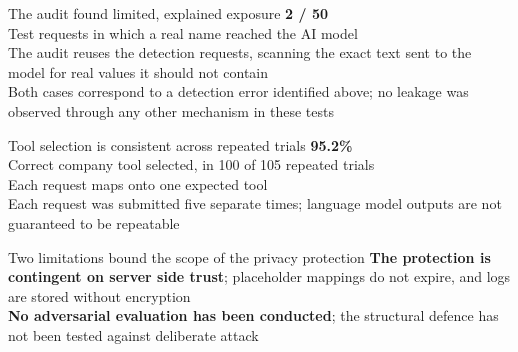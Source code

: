 \documentclass[aspectratio=169,11pt]{beamer}
\begin{document}
\begin{frame}{The audit found limited, explained exposure}
  \centering
  \vspace{3mm}
  {\Huge\bfseries\color{unitnred} 2 / 50}\\[2mm]
  {\small Test requests in which a real name reached the AI model}\\[3mm]
  {\small\color{slidegray} The audit reuses the detection requests, scanning the exact text sent to the model for real values it should not contain}\\[3mm]
  {\footnotesize\color{slidegray} Both cases correspond to a detection error identified above; no leakage was observed through any other mechanism in these tests}
\end{frame}

\begin{frame}{Tool selection is consistent across repeated trials}
  \centering
  \vspace{4mm}
  {\Huge\bfseries\color{slideblue} 95.2\%}\\[2mm]
  {\small Correct company tool selected, in 100 of 105 repeated trials}\\[3mm]
  {\small\color{slidegray} Each request maps onto one expected tool}\\[3mm]
  {\footnotesize\color{slidegray} Each request was submitted five separate times; language model outputs are not guaranteed to be repeatable}
\end{frame}

\begin{frame}{Two limitations bound the scope of the privacy protection}
  \small
  \vspace{4mm}
  \textbf{The protection is contingent on server side trust}; placeholder mappings do not expire, and logs are stored without encryption\\[6mm]
  \textbf{No adversarial evaluation has been conducted}; the structural defence has not been tested against deliberate attack
\end{frame}
\end{document}

